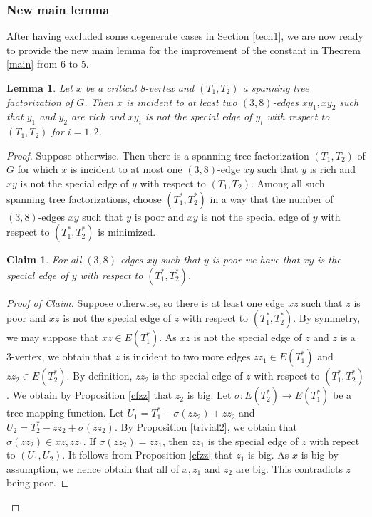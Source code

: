\documentclass{article}
\theoremstyle{plain}
\newtheorem{Lemma}{Lemma}
\newtheorem{Claim}{Claim}
\theoremstyle{nonumberplain}
\theoremstyle{nonumberplain}
\newcommand{\stf}{spanning tree factorization }
\begin{document}
\subsubsection{New main lemma}\label{hstrrh}
After having excluded some degenerate cases in Section \ref{tech1}, we are now ready to provide the new main lemma for the improvement of the constant in Theorem \ref{main} from 6 to 5.
\begin{Lemma}\label{new}
Let $x$ be a critical 8-vertex and $(T_1,T_2)$ a \stf of $G$. Then $x$ is incident to at least two $(3,8)$-edges $xy_1,xy_2$ such that $y_1$ and $y_2$ are rich and $xy_i$ is not the special edge of $y_i$ with respect to $(T_1,T_2)$ for $i=1,2$.
\end{Lemma}
\begin{proof}
Suppose otherwise. Then there is a spanning tree factorization $(T_1,T_2)$ of $G$ for which $x$ is incident to at most one $(3,8)$-edge $xy$ such that $y$ is rich and $xy$ is not the special edge of $y$ with respect to $(T_1,T_2)$. Among all such spanning tree factorizations, choose $(T_1^*,T_2^*)$ in a way that the number of $(3,8)$-edges $xy$ such that $y$ is poor and $xy$ is not the special edge of $y$ with respect to $(T_1^*,T_2^*)$ is minimized.
\begin{Claim}\label{sert}
For all $(3,8)$-edges $xy$ such that $y$ is poor we have that $xy$ is the special edge of $y$ with respect to $(T_1^*,T_2^*)$.
\end{Claim}
\begin{proof}[Proof of Claim]
Suppose otherwise, so there is at least one edge $xz$ such that $z$ is poor and $xz$ is not the special edge of $z$ with respect to $(T_1^*,T_2^*)$. By symmetry, we may suppose that $xz \in E(T_1^*)$. As $xz$ is not the special edge of $z$ and $z$ is a 3-vertex, we obtain that $z$ is incident to two more edges $zz_1\in E(T_1^*)$ and $zz_2 \in E(T_2^*)$. By definition, $zz_2$ is the special edge of $z$ with respect to $(T_1^*,T_2^*)$. We obtain by Proposition \ref{cfzz} that $z_2$ is big. Let $\sigma:E(T_2^*)\rightarrow E(T_1^*)$ be a tree-mapping function.  Let $U_1=T^*_1-\sigma(zz_2)+zz_2$ and $U_2=T_2^*-zz_2+\sigma(zz_2)$. By Proposition \ref{trivial2}, we obtain that $\sigma(zz_2)\in xz,zz_1$. If $\sigma(zz_2)=zz_1$, then $zz_1$ is the special edge of $z$ with repect to $(U_1,U_2)$. It follows from Proposition \ref{cfzz} that $z_1$ is big. As $x$ is big by assumption, we hence obtain that all of $x,z_1$ and $z_2$ are big. This contradicts $z$ being poor.


\end{proof}
\end{proof}
\end{document}
